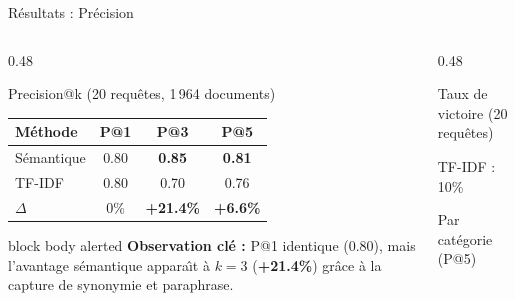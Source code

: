 \documentclass[aspectratio=169, 10pt]{beamer}
\begin{document}
\begin{frame}{R\'{e}sultats : Pr\'{e}cision}
  \begin{columns}[T]
    \begin{column}{0.48\textwidth}
      \begin{block}{Precision@k (20 requ\^{e}tes, 1\,964 documents)}
        \centering
        \begin{tabular}{@{}lccc@{}}
          \toprule
          \textbf{M\'{e}thode} & \textbf{P@1} & \textbf{P@3} & \textbf{P@5} \\
          \midrule
          S\'{e}mantique & 0.80 & \textbf{0.85} & \textbf{0.81} \\
          TF-IDF       & 0.80 & 0.70          & 0.76 \\
          \midrule
          \textbf{$\Delta$} & 0\% & \textbf{+21.4\%} & \textbf{+6.6\%} \\
          \bottomrule
        \end{tabular}
      \end{block}
      \vspace{0.5em}
      \begin{beamercolorbox}[wd=\textwidth, rounded=true, sep=5pt]{block body alerted}
        \textbf{\textcolor{ASTRAnavy}{Observation cl\'{e} :}}
        \textcolor{ASTRAnavy}{\footnotesize P@1 identique (0.80), mais l'avantage s\'{e}mantique appara\^{\i}t \`{a} $k=3$ (\textbf{+21.4\%}) gr\^{a}ce \`{a} la capture de synonymie et paraphrase.}
      \end{beamercolorbox}
    \end{column}
    \begin{column}{0.48\textwidth}
      \begin{block}{Taux de victoire (20 requ\^{e}tes)}
        \centering
        {\tiny\textcolor{tikzorange}{TF-IDF : 10\%}}
      \end{block}
      \vspace{0.5em}
      \begin{block}{Par cat\'{e}gorie (P@5)}

\end{block}
\end{column}
\end{columns}
\end{frame}
\end{document}
